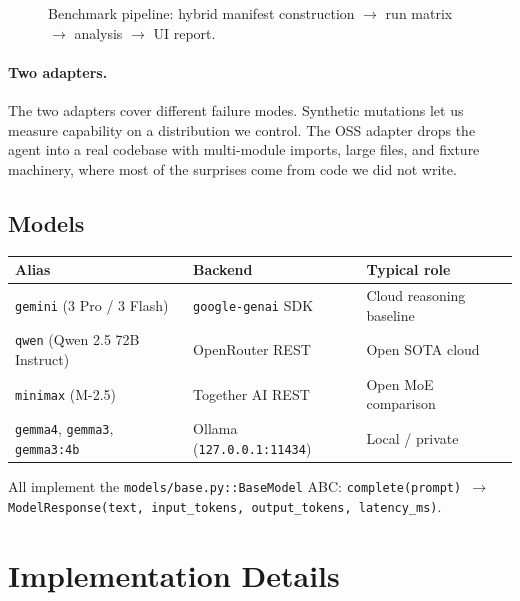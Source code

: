 \documentclass[11pt,letterpaper]{article}
\begin{document}
\begin{figure}[H]
\caption{Benchmark pipeline: hybrid manifest construction $\to$ run matrix $\to$ analysis $\to$ UI report.}
\label{fig:bench}
\end{figure}

\paragraph{Two adapters.} The two adapters cover different failure modes. Synthetic mutations let us measure capability on a distribution we control. The OSS adapter drops the agent into a real codebase with multi-module imports, large files, and fixture machinery, where most of the surprises come from code we did not write.

\subsection{Models}

\begin{tabularx}{\linewidth}{l l X}
\toprule
\textbf{Alias} & \textbf{Backend} & \textbf{Typical role} \\
\midrule
\texttt{gemini} (3 Pro / 3 Flash) & \texttt{google-genai} SDK & Cloud reasoning baseline \\
\texttt{qwen} (Qwen 2.5 72B Instruct) & OpenRouter REST & Open SOTA cloud \\
\texttt{minimax} (M-2.5) & Together AI REST & Open MoE comparison \\
\texttt{gemma4}, \texttt{gemma3}, \texttt{gemma3:4b} & Ollama (\texttt{127.0.0.1:11434}) & Local / private \\
\bottomrule
\end{tabularx}

All implement the \texttt{models/base.py::BaseModel} ABC: \texttt{complete(prompt) $\to$ ModelResponse(text, input\_tokens, output\_tokens, latency\_ms)}.

\section{Implementation Details}
\end{document}
